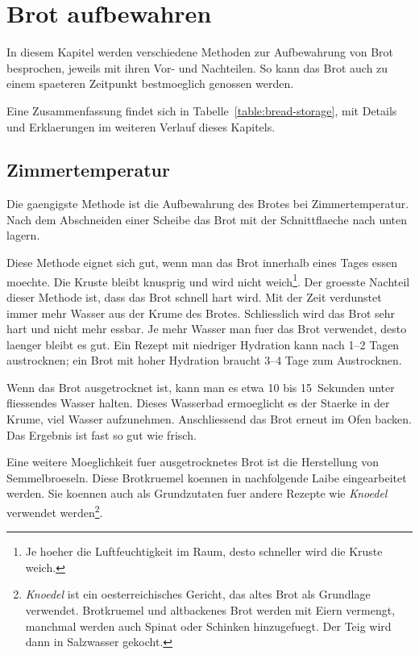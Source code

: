 \chapter{Brot aufbewahren}%
\label{ch:storing-bread}
\begin{quoting}
In diesem Kapitel werden verschiedene Methoden zur Aufbewahrung von Brot
besprochen, jeweils mit ihren Vor- und Nachteilen. So kann das Brot auch zu
einem spaeteren Zeitpunkt bestmoeglich genossen werden.
\end{quoting}

Eine Zusammenfassung findet sich in Tabelle~\ref{table:bread-storage}, mit
Details und Erklaerungen im weiteren Verlauf dieses Kapitels.
\begin{table}[!htb]
    \centering
        
        \caption[Moeglichkeiten zur Brotlagerung]{Eine Tabelle mit den Vor-
            und Nachteilen verschiedener Brotlagerungsmoeglichkeiten.}%
        \label{table:bread-storage}
\end{table}

\section{Zimmertemperatur}

Die gaengigste Methode ist die Aufbewahrung des Brotes bei Zimmertemperatur.
Nach dem Abschneiden einer Scheibe das Brot mit der Schnittflaeche nach unten
lagern.

Diese Methode eignet sich gut, wenn man das Brot innerhalb eines Tages essen
moechte. Die Kruste bleibt knusprig und wird nicht weich\footnote{Je hoeher
    die Luftfeuchtigkeit im Raum, desto schneller wird die Kruste weich.}.
Der groesste Nachteil dieser Methode ist, dass das Brot schnell hart wird.
Mit der Zeit verdunstet immer mehr Wasser aus der Krume des Brotes.
Schliesslich wird das Brot sehr hart und nicht mehr essbar. Je mehr Wasser man
fuer das Brot verwendet, desto laenger bleibt es gut. Ein Rezept mit niedriger
Hydration kann nach 1--2 Tagen austrocknen; ein Brot mit hoher Hydration
braucht 3--4 Tage zum Austrocknen.

Wenn das Brot ausgetrocknet ist, kann man es etwa 10 bis 15~Sekunden unter
fliessendes Wasser halten. Dieses Wasserbad ermoeglicht es der Staerke in der
Krume, viel Wasser aufzunehmen. Anschliessend das Brot erneut im Ofen backen.
Das Ergebnis ist fast so gut wie frisch.

Eine weitere Moeglichkeit fuer ausgetrocknetes Brot ist die Herstellung von
Semmelbroeseln. Diese Brotkruemel koennen in nachfolgende Laibe eingearbeitet
werden. Sie koennen auch als Grundzutaten fuer andere Rezepte wie
\emph{Knoedel} verwendet werden\footnote{\emph{Knoedel} ist ein
    oesterreichisches Gericht, das altes Brot als Grundlage verwendet.
  Brotkruemel und altbackenes Brot werden mit Eiern vermengt, manchmal
  werden auch Spinat oder Schinken hinzugefuegt. Der Teig wird dann in
  Salzwasser gekocht.
}.


